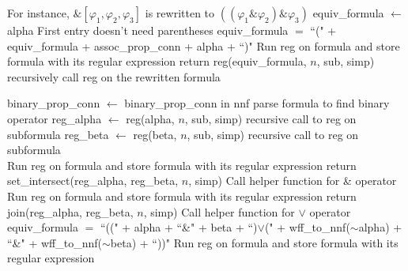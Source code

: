 \documentclass[runningheads]{llncs}
\renewcommand{\phi}{\varphi}
\begin{document}
\begin{algorithm}[H]
\begin{algorithmic}
        \Comment For instance, $\&[\phi_1, \phi_2, \phi_3]$ is rewritten to $((\phi_1 \& \phi_2) \& \phi_3)$
                \State equiv\_formula $\leftarrow$ alpha
                \Comment First entry doesn't need parentheses
            \Else
                \State equiv\_formula $=$ ``(" + equiv\_formula + assoc\_prop\_conn + alpha + ``)"
            \EndIf
        \EndFor
            \State Run reg on formula and store formula with its regular expression
        \EndIf
        \State return reg(equiv\_formula, $n$, sub, simp)
        \Comment recursively call reg on the rewritten formula
    \EndIf
\end{algorithmic}
\end{algorithm}
\begin{algorithm}[H]
\begin{algorithmic}
        \State binary\_prop\_conn $\leftarrow$ binary\_prop\_conn in nnf
        \Comment parse formula to find binary operator
        \State reg\_alpha $\leftarrow$ reg(alpha, $n$, sub, simp)
        \Comment recursive call to reg on subformula
        \State reg\_beta $\leftarrow$ reg(beta, $n$, sub, simp)
        \Comment recursive call to reg on subformula\\
                \State Run reg on formula and store formula with its regular expression
            \EndIf
            \State return set\_intersect(reg\_alpha, reg\_beta, $n$, simp)
            \Comment Call helper function for \& operator
        \EndIf\\
                \State Run reg on formula and store formula with its regular expression
            \EndIf
            \State return join(reg\_alpha, reg\_beta, $n$, simp)
            \Comment Call helper function for $\lor$ operator
        \EndIf\\
            \State equiv\_formula $=$ ``((" + alpha + ``\&" + beta + ``)$\lor$(" + wff\_to\_nnf($\scriptstyle{\sim}$alpha) + 
            \State ``\&" + wff\_to\_nnf($\scriptstyle{\sim}$beta) + ``))"
                \State Run reg on formula and store formula with its regular expression
            \EndIf

\end{algorithmic}
\end{algorithm}
\end{document}
